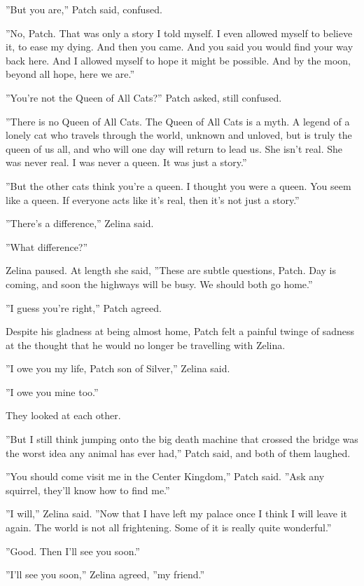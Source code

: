 \documentclass[12pt]{book}
\begin{document}
''But you are,'' Patch said, confused.

''No, Patch. That was only a story I told myself. I even allowed
myself to believe it, to ease my dying. And then you came. And you
said you would find your way back here. And I allowed myself to hope
it might be possible. And by the moon, beyond all hope, here we are.''

''You're not the Queen of All Cats?'' Patch asked, still confused.

''There is no Queen of All Cats. The Queen of All Cats is a myth. A
legend of a lonely cat who travels through the world, unknown and
unloved, but is truly the queen of us all, and who will one day will
return to lead us. She isn't real. She was never real. I was never a
queen. It was just a story.''

''But the other cats think you're a queen. I thought you were a
queen. You seem like a queen. If everyone acts like it's real, then
it's not just a story.''

''There's a difference,'' Zelina said.

''What difference?''

Zelina paused. At length she said, ''These are subtle questions,
Patch. Day is coming, and soon the highways will be busy. We should
both go home.''

''I guess you're right,'' Patch agreed.

Despite his gladness at being almost home, Patch felt a painful twinge
of sadness at the thought that he would no longer be travelling with
Zelina.

''I owe you my life, Patch son of Silver,'' Zelina said.

''I owe you mine too.''

They looked at each other.

''But I still think jumping onto the big death machine that crossed
the bridge was the worst idea any animal has ever had,'' Patch said,
and both of them laughed.

''You should come visit me in the Center Kingdom,'' Patch said. ''Ask
any squirrel, they'll know how to find me.''

''I will,'' Zelina said. ''Now that I have left my palace once I think
I will leave it again. The world is not all frightening. Some of it is
really quite wonderful.''

''Good. Then I'll see you soon.''

''I'll see you soon,'' Zelina agreed, ''my friend.''
\end{document}
